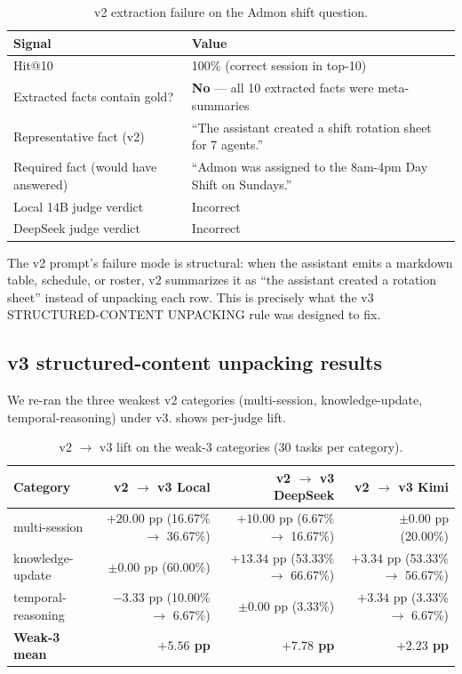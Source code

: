 \documentclass{article}
\begin{document}
\begin{table}[h]
\centering
\small
\caption{v2 extraction failure on the Admon shift question.}
\label{tab:admon}
\begin{tabular}{lp{8.4cm}}
\toprule
Signal & Value \\
\midrule
Hit@10 & 100\% (correct session in top-10) \\
Extracted facts contain gold? & \textbf{No} --- all 10 extracted facts were meta-summaries \\
Representative fact (v2) & ``The assistant created a shift rotation sheet for 7 agents.'' \\
Required fact (would have answered) & ``Admon was assigned to the 8am-4pm Day Shift on Sundays.'' \\
Local 14B judge verdict & Incorrect \\
DeepSeek judge verdict & Incorrect \\
\bottomrule
\end{tabular}
\end{table}

The v2 prompt's failure mode is structural: when the assistant emits a markdown table, schedule, or roster, v2 summarizes it as ``the assistant created a rotation sheet'' instead of unpacking each row. This is precisely what the v3 STRUCTURED-CONTENT UNPACKING rule was designed to fix.

\subsection{v3 structured-content unpacking results}

We re-ran the three weakest v2 categories (multi-session, knowledge-update, temporal-reasoning) under v3.  shows per-judge lift.

\begin{table}[h]
\centering
\small
\caption{v2 $\to$ v3 lift on the weak-3 categories (30 tasks per category).}
\label{tab:v3lift}
\begin{tabular}{lrrr}
\toprule
Category            & v2 $\to$ v3 Local & v2 $\to$ v3 DeepSeek & v2 $\to$ v3 Kimi \\
\midrule
multi-session       & $+20.00$ pp (16.67\% $\to$ 36.67\%) & $+10.00$ pp (6.67\% $\to$ 16.67\%) & $\pm0.00$ pp (20.00\%) \\
knowledge-update    & $\pm0.00$ pp (60.00\%) & $+13.34$ pp (53.33\% $\to$ 66.67\%) & $+3.34$ pp (53.33\% $\to$ 56.67\%) \\
temporal-reasoning  & $-3.33$ pp (10.00\% $\to$ 6.67\%) & $\pm0.00$ pp (3.33\%) & $+3.34$ pp (3.33\% $\to$ 6.67\%) \\
\midrule
\textbf{Weak-3 mean} & \textbf{$+5.56$ pp} & \textbf{$+7.78$ pp} & \textbf{$+2.23$ pp} \\
\bottomrule
\end{tabular}
\end{table}
\end{document}
